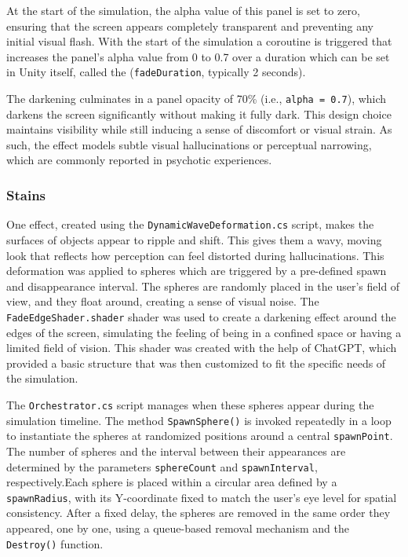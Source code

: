 At the start of the simulation, the alpha value of this panel is set to zero, ensuring that the screen appears completely transparent and preventing any initial visual flash. With the start of the simulation a coroutine is triggered that increases the panel’s alpha value from 0 to 0.7 over a duration which can be set in Unity itself, called the (\texttt{fadeDuration}, typically 2 seconds).

The darkening culminates in a panel opacity of 70\% (i.e., \texttt{alpha = 0.7}), which darkens the screen significantly without making it fully dark. This design choice maintains visibility while still inducing a sense of discomfort or visual strain. As such, the effect models subtle visual hallucinations or perceptual narrowing, which are commonly reported in psychotic experiences. 

\subsubsection{Stains}
One effect, created using the \texttt{DynamicWaveDeformation.cs} script, makes the surfaces of objects appear to ripple and shift. This gives them a wavy, moving look that reflects how perception can feel distorted during hallucinations. This deformation was applied to spheres which are triggered by a pre-defined spawn and disappearance interval. The spheres are randomly placed in the user's field of view, and they float around, creating a sense of visual noise. The \texttt{FadeEdgeShader.shader} shader was used to create a darkening effect around the edges of the screen, simulating the feeling of being in a confined space or having a limited field of vision. This shader was created with the help of ChatGPT, which provided a basic structure that was then customized to fit the specific needs of the simulation.

The \texttt{Orchestrator.cs} script manages when these spheres appear during the simulation timeline. The method \texttt{SpawnSphere()} is invoked repeatedly in a loop to instantiate the spheres at randomized positions around a central \texttt{spawnPoint}. The number of spheres and the interval between their appearances are determined by the parameters \texttt{sphereCount} and \texttt{spawnInterval}, respectively.Each sphere is placed within a circular area defined by a \texttt{spawnRadius}, with its Y-coordinate fixed to match the user’s eye level for spatial consistency. After a fixed delay, the spheres are removed in the same order they appeared, one by one, using a queue-based removal mechanism and the \texttt{Destroy()} function. 

